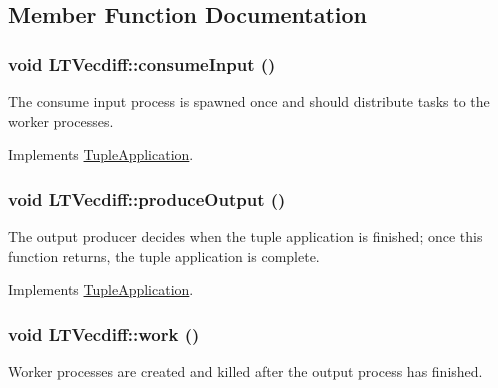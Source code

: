 \subsection{Member Function Documentation}
\hypertarget{class_l_t_vecdiff_9daf31de467c9694e59b55936780dce8}{
\subsubsection[{consumeInput}]{\setlength{\rightskip}{0pt plus 5cm}void LTVecdiff::consumeInput ()}}
\label{class_l_t_vecdiff_9daf31de467c9694e59b55936780dce8}


The consume input process is spawned once and should distribute tasks to the worker processes. 

Implements \hyperlink{class_tuple_application_e163c5a536de01c8b94b49528a17dab2}{TupleApplication}.\hypertarget{class_l_t_vecdiff_69d3c6e3c51052522d474cc75d11a2f2}{
\subsubsection[{produceOutput}]{\setlength{\rightskip}{0pt plus 5cm}void LTVecdiff::produceOutput ()}}
\label{class_l_t_vecdiff_69d3c6e3c51052522d474cc75d11a2f2}


The output producer decides when the tuple application is finished; once this function returns, the tuple application is complete. 

Implements \hyperlink{class_tuple_application_8743dfcf17dedd52887c0b2ab170d8dc}{TupleApplication}.\hypertarget{class_l_t_vecdiff_0117017e12284b1eb57532ca447684f6}{
\subsubsection[{work}]{\setlength{\rightskip}{0pt plus 5cm}void LTVecdiff::work ()}}
\label{class_l_t_vecdiff_0117017e12284b1eb57532ca447684f6}


Worker processes are created and killed after the output process has finished. 

